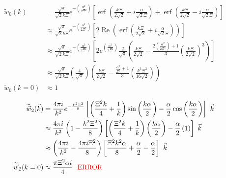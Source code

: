 \documentclass[double,12pt]{beavtex}
\begin{document}
\begin{align}
    \widetilde{w}_0(k) &= \frac{\sqrt{\pi}}{\sqrt{2}k\Xi}e^{-\left(\frac{\alpha^2}{2\Xi^2}\right)}\left[\operatorname{erf}
    \left(\frac{k\Xi}{2\sqrt{2}}+i\frac{\alpha}{\sqrt{2}\Xi}\right)
    +\operatorname{erf}\left(\frac{k\Xi}{2\sqrt{2}}-i\frac{\alpha}{\sqrt{2}\Xi}\right)\right] \\
    & \approx   \frac{\sqrt{\pi}}{\sqrt{2}k\Xi}e^{-\left(\frac{\alpha^2}{2\Xi^2}\right)}\left[2\operatorname{Re}\left(\operatorname{erf}\left(\frac{k\Xi}{2\sqrt{2}}+i\frac{\alpha}{\sqrt{2}\Xi}\right)\right)\right]  \\
    & \approx   \frac{\sqrt{\pi}}{\sqrt{2}k\Xi}e^{-\left(\frac{\alpha^2}{2\Xi^2}\right)}\left[2e^{\left(\frac{\alpha^2}{2\Xi^2}\right)}\frac{2}{\sqrt{\pi}}\left(\frac{k\Xi}{2\sqrt{2}} -\frac{2\left(\frac{\alpha^2}{2\Xi^2}\right)+1}{3}\left(\frac{k\Xi}{2\sqrt{2}}\right)^3\right)\right]  \\
    & \approx   \frac{\sqrt{\pi}}{\sqrt{2}k\Xi}\left(\frac{4}{\sqrt{\pi}}\right)\left(\frac{k\Xi}{2\sqrt{2}} -\frac{\frac{\alpha^2}{\Xi^2}+1}{3}\left(\frac{k^3\Xi^3}{16\sqrt{2}}\right)\right) \\
     \widetilde{w}_0(k=0) & \approx 1
\end{align}

\begin{align}
   \widetilde{\vec{w}}_2(\vec{k})&= \frac{4\pi{i}}{k^2}e^{-\frac{k^2\Xi^2}{8}}
   \left[\left(\frac{\Xi^2k}{4}+\frac{1}{k}\right)\sin\left(\frac{k\alpha}{2}\right)
   -\frac{\alpha}{2}\cos\left(\frac{k\alpha}{2}\right)\right]{~}\vec{k}  \\
    & \approx  \frac{4\pi{i}}{k^2}\left(1-\frac{k^2\Xi^2}{8}\right)\left[\left(\frac{\Xi^2k}{4}+\frac{1}{k}\right)\left(\frac{k\alpha}{2}\right)-\frac{\alpha}{2}\left(1\right)\right]{~}\vec{k}\\
    & \approx  \left(\frac{4\pi{i}}{k^2}-\frac{4\pi i\Xi^2}{8}\right)\left[\frac{\Xi^2k^2\alpha}{8}+\frac{\alpha}{2}-\frac{\alpha}{2}\right]{~}\vec{k} \\
    \widetilde{\vec w}_2(k=0) & \approx \frac{\pi\Xi^2\alpha i}{4}  \mbox{\textcolor{red}{~~ERROR}}
\end{align}
\end{document}
